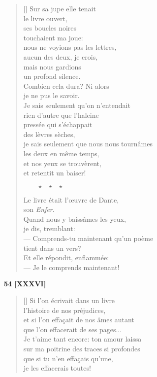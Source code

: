 \documentclass[a4paper,12pt]{book}
\begin{document}
\begin{verse}[\versewidth]
  Sur sa jupe elle tenait \\
  le livre ouvert, \\
  ses boucles noires \\
  touchaient ma joue:\\
  nous ne voyions pas les lettres, \\
  aucun des deux, je crois, \\
  mais nous gardions \\
  un profond silence. \\
  Combien cela dura? Ni alors \\
  je ne pus le savoir. \\
  Je sais seulement qu'on n'entendait \\
  rien d'autre que l'haleine \\
  pressée qui s'échappait \\
  des lèvres sèches, \\
  je sais seulement que nous nous tournâmes \\
  les deux en même temps, \\
  et nos yeux se trouvèrent, \\
  et retentit un baiser!

  $\ \ \ \ \ \ \ \ \ \star \ \ \ \star \ \ \ \star$

  Le livre était l'œuvre de Dante, \\
  son \emph{Enfer}. \\
  Quand nous y baissâmes les yeux, \\
  je dis, tremblant: \\
  --- Comprends-tu maintenant qu'un poème \\
    tient dans un vers? \\
  Et elle répondit, enflammée: \\
  --- Je le comprends maintenant!
\end{verse}

\bigskip

\begin{center}
  \textbf{54 [XXXVI]}
\end{center}

\settowidth{\versewidth}{et si s'effaçait de nos âmes autant}

\begin{verse}[\versewidth]
  Si l'on écrivait dans un livre \\
  l'histoire de nos préjudices, \\
  et si l'on effaçait de nos âmes autant \\
  que l'on effacerait de ses pages... \\
  Je t'aime tant encore: ton amour laissa \\
  sur ma poitrine des traces si profondes \\
  que si tu n'en effaçais qu'une, \\
  je les effacerais toutes!
\end{verse}
\end{document}
